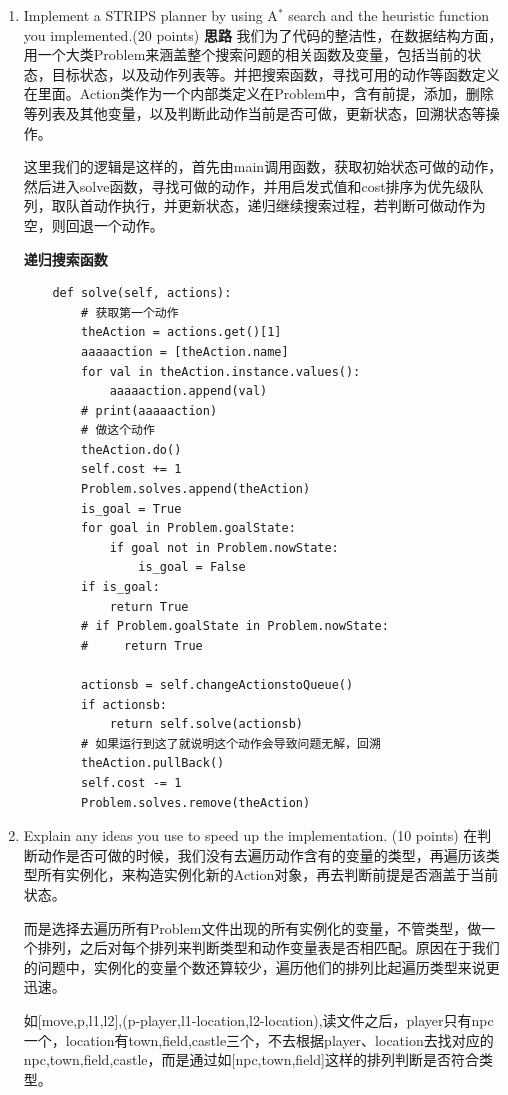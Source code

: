 \documentclass[a4paper, 11pt]{article}
\begin{document}
\begin{enumerate}
    

\item Implement a STRIPS planner by using A$^*$ search and the heuristic function you implemented.(20 points)
\textbf{思路}
	我们为了代码的整洁性，在数据结构方面，用一个大类Problem来涵盖整个搜索问题的相关函数及变量，包括当前的状态，目标状态，以及动作列表等。并把搜索函数，寻找可用的动作等函数定义在里面。Action类作为一个内部类定义在Problem中，含有前提，添加，删除等列表及其他变量，以及判断此动作当前是否可做，更新状态，回溯状态等操作。
	
	这里我们的逻辑是这样的，首先由main调用函数，获取初始状态可做的动作，然后进入solve函数，寻找可做的动作，并用启发式值和cost排序为优先级队列，取队首动作执行，并更新状态，递归继续搜索过程，若判断可做动作为空，则回退一个动作。
	
	\textbf{递归搜索函数}
	\begin{lstlisting}
    def solve(self, actions):
        # 获取第一个动作
        theAction = actions.get()[1]
        aaaaaction = [theAction.name]
        for val in theAction.instance.values():
            aaaaaction.append(val)
        # print(aaaaaction)
        # 做这个动作
        theAction.do()
        self.cost += 1
        Problem.solves.append(theAction)
        is_goal = True
        for goal in Problem.goalState:
            if goal not in Problem.nowState:
                is_goal = False
        if is_goal:
            return True
        # if Problem.goalState in Problem.nowState:
        #     return True

        actionsb = self.changeActionstoQueue()
        if actionsb:
            return self.solve(actionsb)
        # 如果运行到这了就说明这个动作会导致问题无解，回溯
        theAction.pullBack()
        self.cost -= 1
        Problem.solves.remove(theAction)	
	\end{lstlisting}
\item Explain any ideas you use to speed up the implementation. (10 points)
	在判断动作是否可做的时候，我们没有去遍历动作含有的变量的类型，再遍历该类型所有实例化，来构造实例化新的Action对象，再去判断前提是否涵盖于当前状态。
	
	而是选择去遍历所有Problem文件出现的所有实例化的变量，不管类型，做一个排列，之后对每个排列来判断类型和动作变量表是否相匹配。原因在于我们的问题中，实例化的变量个数还算较少，遍历他们的排列比起遍历类型来说更迅速。
	
	如[move,p,l1,l2],(p-player,l1-location,l2-location),读文件之后，player只有npc一个，location有town,field,castle三个，不去根据player、location去找对应的npc,town,field,castle，而是通过如[npc,town,field]这样的排列判断是否符合类型。
	

\end{enumerate}
\end{document}
